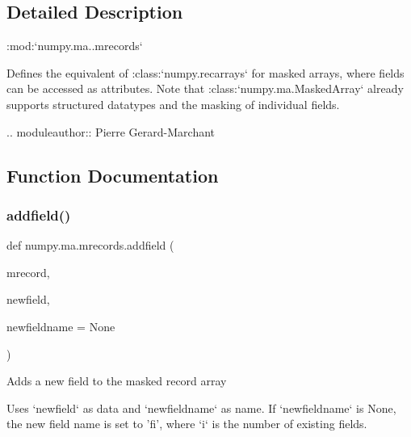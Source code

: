 \subsection{Detailed Description}
\begin{DoxyVerb}:mod:`numpy.ma..mrecords`

Defines the equivalent of :class:`numpy.recarrays` for masked arrays,
where fields can be accessed as attributes.
Note that :class:`numpy.ma.MaskedArray` already supports structured datatypes
and the masking of individual fields.

.. moduleauthor:: Pierre Gerard-Marchant\end{DoxyVerb}
 

\subsection{Function Documentation}
\mbox{\label{namespacenumpy_1_1ma_1_1mrecords_aab8c28cddff89a1854da159f62102747}} 
\subsubsection{\texorpdfstring{addfield()}{addfield()}}
{\footnotesize\ttfamily def numpy.\+ma.\+mrecords.\+addfield (\begin{DoxyParamCaption}\item[{}]{mrecord,  }\item[{}]{newfield,  }\item[{}]{newfieldname = {\ttfamily None} }\end{DoxyParamCaption})}

\begin{DoxyVerb}Adds a new field to the masked record array

Uses `newfield` as data and `newfieldname` as name. If `newfieldname`
is None, the new field name is set to 'fi', where `i` is the number of
existing fields.\end{DoxyVerb}
 \mbox{\label{namespacenumpy_1_1ma_1_1mrecords_a7a6d16a1971e40fd2fd2a6c6cfe4b457}} 
